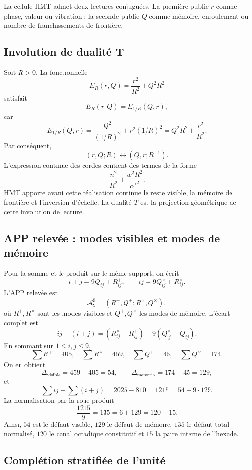 \begin{principle}
La cellule HMT admet deux lectures conjuguées. La première publie \(r\) comme
phase, valeur ou vibration ; la seconde publie \(Q\) comme mémoire,
enroulement ou nombre de franchissements de frontière.
\end{principle}

\subsection{Involution de dualité T}

Soit \(R>0\). La fonctionnelle
\[
E_R(r,Q)=\frac{r^2}{R^2}+Q^2R^2
\]
satisfait
\[
E_R(r,Q)=E_{1/R}(Q,r),
\]
car
\[
E_{1/R}(Q,r)
=\frac{Q^2}{(1/R)^2}+r^2(1/R)^2
=Q^2R^2+\frac{r^2}{R^2}.
\]
Par conséquent,
\[
(r,Q;R)\longleftrightarrow(Q,r;R^{-1}).
\]
L'expression continue des cordes contient des termes de la forme
\[
\frac{n^2}{R^2}+\frac{w^2R^2}{\alpha'^2}.
\]
HMT apporte avant cette réalisation continue le reste visible, la mémoire
de frontière et l'inversion d'échelle. La dualité \(T\) est la projection
géométrique de cette involution de lecture.

\subsection{APP relevée : modes visibles et modes de mémoire}

Pour la somme et le produit sur le même support, on écrit
\[
i+j=9Q^+_{ij}+R^+_{ij},
\qquad
ij=9Q^\times_{ij}+R^\times_{ij}.
\]
L'APP relevée est
\[
\mathcal A_9^\sharp=(R^+,Q^+;R^\times,Q^\times),
\]
où \(R^+,R^\times\) sont les modes visibles et
\(Q^+,Q^\times\) les modes de mémoire. L'écart complet est
\[
ij-(i+j)
=(R^\times_{ij}-R^+_{ij})
+9(Q^\times_{ij}-Q^+_{ij}).
\]
En sommant sur \(1\leq i,j\leq9\),
\[
\sum R^+=405,
\quad
\sum R^\times=459,
\quad
\sum Q^+=45,
\quad
\sum Q^\times=174.
\]
On en obtient
\[
\Delta_{\mathrm{visible}}=459-405=54,
\qquad
\Delta_{\mathrm{memoria}}=174-45=129,
\]
et
\[
\sum ij-\sum(i+j)=2025-810=1215=54+9\cdot129.
\]
La normalisation par la roue produit
\[
\frac{1215}{9}=135=6+129=120+15.
\]
Ainsi, \(54\) est le défaut visible, \(129\) le défaut de mémoire,
\(135\) le défaut total normalisé, \(120\) le canal octadique constitutif
et \(15\) la paire interne de l'hexade.

\subsection{Complétion stratifiée de l'unité}

